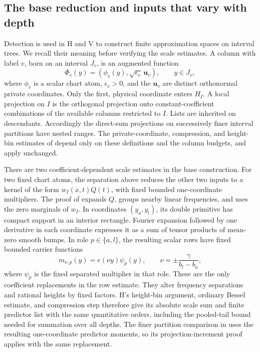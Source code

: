 \subsection{The base reduction and inputs that vary with depth}

Detection is used in H and V to construct finite approximation spaces
on interval trees.  We recall their meaning before verifying the scale
estimates.  A column with label \(v\), born on an interval \(J_v\),
is an augmented function
\[
 \Phi_v(y)=(\phi_v(y),\sqrt{\epsilon_v}\,\mathbf u_v),
 \qquad y\in J_v,
\]
where \(\phi_v\) is a scalar chart atom, \(\epsilon_v>0\), and the
\(\mathbf u_v\) are distinct orthonormal private coordinates.  Only
the first, physical coordinate enters \(H_I\).  A local projection
on \(I\) is the orthogonal projection onto constant-coefficient
combinations of the available columns restricted to \(I\).  Lists
are inherited on descendants.  Accordingly the direct-sum projections
on successively finer interval partitions have nested ranges.  The
private-coordinate, compression, and height-bin estimates of
\cite[Section~3]{H} depend only on these definitions and the column
budgets, and apply unchanged.

There are two coefficient-dependent scale estimates in the base
construction.  For two fixed chart atoms, the separation above reduces
the other two inputs to a kernel of the form
\(w_I(x,t)Q(t)\), with fixed bounded one-coordinate multipliers.
The proof of \cite[Lemma~5.1 and Corollary~5.2]{H} expands \(Q\),
groups nearby linear frequencies, and uses the zero marginals of
\(w_I\).  In coordinates \((y_a,y_l)\), its double primitive has
compact support in an interior rectangle.  Fourier expansion followed
by one derivative in each coordinate expresses it as a sum of tensor
products of mean-zero smooth bumps.  In role \(p\in\{a,l\}\), the
resulting scalar rows have fixed bounded carrier functions
\[
 m_{\nu,p}(y)=e(\nu y)\psi_p(y),
 \qquad \nu=\pm\frac{\gamma}{b_l-b_a},
\]
where \(\psi_p\) is the fixed separated multiplier in that role.
These are the only coefficient replacements in the row estimate.
They alter frequency separations and rational heights by fixed
factors.  H's height-bin argument, ordinary Bessel estimate, and
compression step therefore give its absolute scale sum and finite
predictor list with the same quantitative orders, including the
pooled-tail bound needed for summation over all depths.  The finer
partition comparison in \cite[Lemma~5.3]{H} uses the resulting
one-coordinate predictor moments, so its projection-increment proof
applies with the same replacement.

